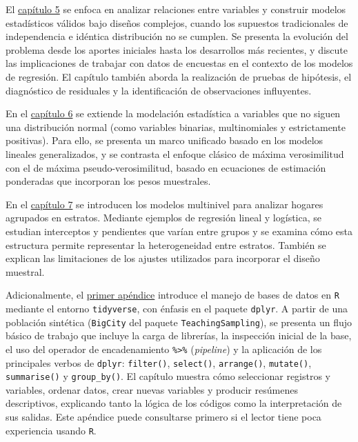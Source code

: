 \documentclass[
  spanish,
  11pt,
  letterpaper,
  oneside,
  open=any]{scrbook}
\begin{document}
El \href{05-Regresion.qmd}{capítulo 5} se enfoca en analizar relaciones
entre variables y construir modelos estadísticos válidos bajo diseños
complejos, cuando los supuestos tradicionales de independencia e
idéntica distribución no se cumplen. Se presenta la evolución del
problema desde los aportes iniciales hasta los desarrollos más
recientes, y discute las implicaciones de trabajar con datos de
encuestas en el contexto de los modelos de regresión. El capítulo
también aborda la realización de pruebas de hipótesis, el diagnóstico de
residuales y la identificación de observaciones influyentes.

En el \href{06-GLM.qmd}{capítulo 6} se extiende la modelación
estadística a variables que no siguen una distribución normal (como
variables binarias, multinomiales y estrictamente positivas). Para ello,
se presenta un marco unificado basado en los modelos lineales
generalizados, y se contrasta el enfoque clásico de máxima verosimilitud
con el de máxima pseudo-verosimilitud, basado en ecuaciones de
estimación ponderadas que incorporan los pesos muestrales.

En el \href{07-Multinivel.qmd}{capítulo 7} se introducen los modelos
multinivel para analizar hogares agrupados en estratos. Mediante
ejemplos de regresión lineal y logística, se estudian interceptos y
pendientes que varían entre grupos y se examina cómo esta estructura
permite representar la heterogeneidad entre estratos. También se
explican las limitaciones de los ajustes utilizados para incorporar el
diseño muestral.

Adicionalmente, el \hyperref[ap1]{primer apéndice} introduce el manejo
de bases de datos en \texttt{R} mediante el entorno \texttt{tidyverse},
con énfasis en el paquete \texttt{dplyr}. A partir de una población
sintética (\texttt{BigCity} del paquete \texttt{TeachingSampling}), se
presenta un flujo básico de trabajo que incluye la carga de librerías,
la inspección inicial de la base, el uso del operador de encadenamiento
\texttt{\%\textgreater{}\%} (\emph{pipeline}) y la aplicación de los
principales verbos de \texttt{dplyr}: \texttt{filter()},
\texttt{select()}, \texttt{arrange()}, \texttt{mutate()},
\texttt{summarise()} y \texttt{group\_by()}. El capítulo muestra cómo
seleccionar registros y variables, ordenar datos, crear nuevas variables
y producir resúmenes descriptivos, explicando tanto la lógica de los
códigos como la interpretación de sus salidas. Este apéndice puede
consultarse primero si el lector tiene poca experiencia usando
\texttt{R}.
\end{document}
